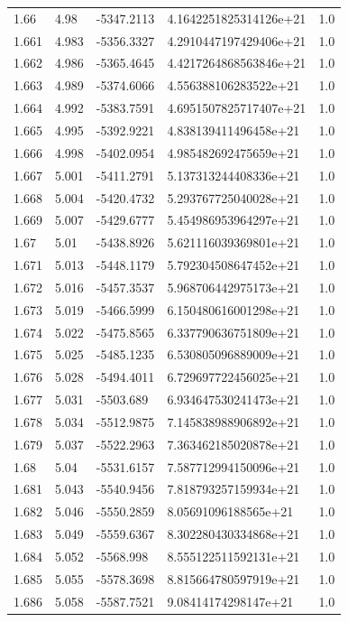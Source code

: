 \begin{tabular}{lllll}
1.66 & 4.98 & -5347.2113 & 4.1642251825314126e+21 & 1.0 \\
1.661 & 4.983 & -5356.3327 & 4.2910447197429406e+21 & 1.0 \\
1.662 & 4.986 & -5365.4645 & 4.4217264868563846e+21 & 1.0 \\
1.663 & 4.989 & -5374.6066 & 4.556388106283522e+21 & 1.0 \\
1.664 & 4.992 & -5383.7591 & 4.6951507825717407e+21 & 1.0 \\
1.665 & 4.995 & -5392.9221 & 4.838139411496458e+21 & 1.0 \\
1.666 & 4.998 & -5402.0954 & 4.985482692475659e+21 & 1.0 \\
1.667 & 5.001 & -5411.2791 & 5.137313244408336e+21 & 1.0 \\
1.668 & 5.004 & -5420.4732 & 5.293767725040028e+21 & 1.0 \\
1.669 & 5.007 & -5429.6777 & 5.454986953964297e+21 & 1.0 \\
1.67 & 5.01 & -5438.8926 & 5.621116039369801e+21 & 1.0 \\
1.671 & 5.013 & -5448.1179 & 5.792304508647452e+21 & 1.0 \\
1.672 & 5.016 & -5457.3537 & 5.968706442975173e+21 & 1.0 \\
1.673 & 5.019 & -5466.5999 & 6.150480616001298e+21 & 1.0 \\
1.674 & 5.022 & -5475.8565 & 6.337790636751809e+21 & 1.0 \\
1.675 & 5.025 & -5485.1235 & 6.530805096889009e+21 & 1.0 \\
1.676 & 5.028 & -5494.4011 & 6.729697722456025e+21 & 1.0 \\
1.677 & 5.031 & -5503.689 & 6.934647530241473e+21 & 1.0 \\
1.678 & 5.034 & -5512.9875 & 7.145838988906892e+21 & 1.0 \\
1.679 & 5.037 & -5522.2963 & 7.363462185020878e+21 & 1.0 \\
1.68 & 5.04 & -5531.6157 & 7.587712994150096e+21 & 1.0 \\
1.681 & 5.043 & -5540.9456 & 7.818793257159934e+21 & 1.0 \\
1.682 & 5.046 & -5550.2859 & 8.05691096188565e+21 & 1.0 \\
1.683 & 5.049 & -5559.6367 & 8.302280430334868e+21 & 1.0 \\
1.684 & 5.052 & -5568.998 & 8.555122511592131e+21 & 1.0 \\
1.685 & 5.055 & -5578.3698 & 8.815664780597919e+21 & 1.0 \\
1.686 & 5.058 & -5587.7521 & 9.08414174298147e+21 & 1.0 \\

\end{tabular}
